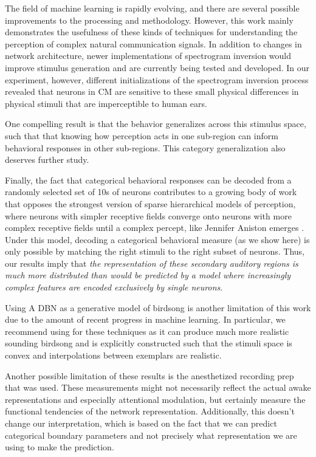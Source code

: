 The field of machine learning is rapidly evolving, and there are several possible improvements to the processing and methodology. However, this work mainly demonstrates the usefulness of these kinds of techniques for understanding the perception of complex natural communication signals. In addition to changes in network architecture, newer implementations of spectrogram inversion would improve stimulus generation and are currently being tested and developed. In our experiment, however, different initializations of the spectrogram inversion process revealed that neurons in \ac{CM} are sensitive to these small physical differences in physical stimuli that are imperceptible to human ears.

One compelling result is that the behavior generalizes across this stimulus space, such that that knowing how perception acts in one sub-region can inform behavioral responses in other sub-regions. This category generalization also deserves further study.

Finally, the fact that categorical behavioral responses can be decoded from a randomly selected set of 10s of neurons contributes to a growing body of work \cite{jeanne2011emergence,kozlov2016central} that opposes the strongest version of sparse hierarchical models of perception, where neurons with simpler receptive fields converge onto neurons with more complex receptive fields until a complex percept, like Jennifer Aniston emerges \cite{quiroga2005invariant}. Under this model, decoding a categorical behavioral measure (as we show here) is only possible by matching the right stimuli to the right subset of neurons. Thus, our results imply that \emph{the representation of these secondary auditory regions is much more distributed than would be predicted by a model where increasingly complex features are encoded exclusively by single neurons}.

Using A DBN as a generative model of birdsong is another limitation of this work due to the amount of recent progress in machine learning. In particular, we recommend using \cite{GAIA} for these techniques as it can produce much more realistic sounding birdsong and is explicitly constructed such that the stimuli space is convex and interpolations between exemplars are realistic. 

Another possible limitation of these results is the anesthetized recording prep that was used. These measurements might not necessarily reflect the actual awake representations and especially attentional modulation, but certainly measure the functional tendencies of the network representation\cite{Emily's attention paper?, Dan's chronic paper?}. Additionally, this doesn't change our interpretation, which is based on the fact that we can predict categorical boundary parameters and not precisely what representation we are using to make the prediction.

